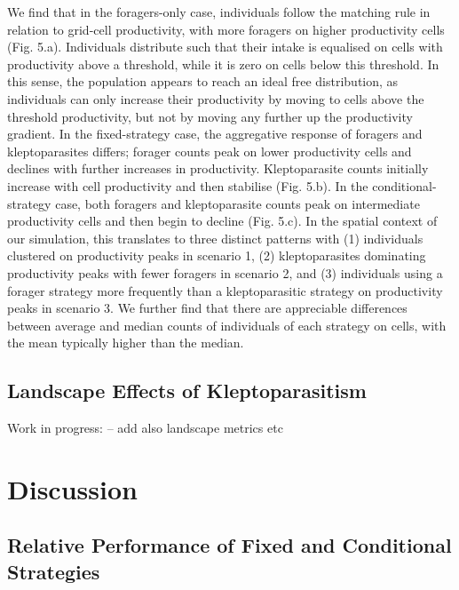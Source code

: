 \documentclass[11pt]{article}
\begin{document}
We find that in the foragers-only case, individuals follow the matching rule in relation to grid-cell productivity, with more foragers on higher productivity cells (Fig. 5.a).
Individuals distribute such that their intake is equalised on cells with productivity above a threshold, while it is zero on cells below this threshold.
In this sense, the population appears to reach an ideal free distribution, as individuals can only increase their productivity by moving to cells above the threshold productivity, but not by moving any further up the productivity gradient.
In the fixed-strategy case, the aggregative response of foragers and kleptoparasites differs; forager counts peak on lower productivity cells and declines with further increases in productivity.
Kleptoparasite counts initially increase with cell productivity and then stabilise (Fig. 5.b).
In the conditional-strategy case, both foragers and kleptoparasite counts peak on intermediate productivity cells and then begin to decline (Fig. 5.c).
In the spatial context of our simulation, this translates to three distinct patterns with (1) individuals clustered on productivity peaks in scenario 1, (2) kleptoparasites dominating productivity peaks with fewer foragers in scenario 2, and (3) individuals using a forager strategy more frequently than a kleptoparasitic strategy on productivity peaks in scenario 3.
We further find that there are appreciable differences between average and median counts of individuals of each strategy on cells, with the mean typically higher than the median.

\subsection{Landscape Effects of Kleptoparasitism}

Work in progress: -- add also landscape metrics etc


\section{Discussion}

\subsection{Relative Performance of Fixed and Conditional Strategies}
\end{document}
